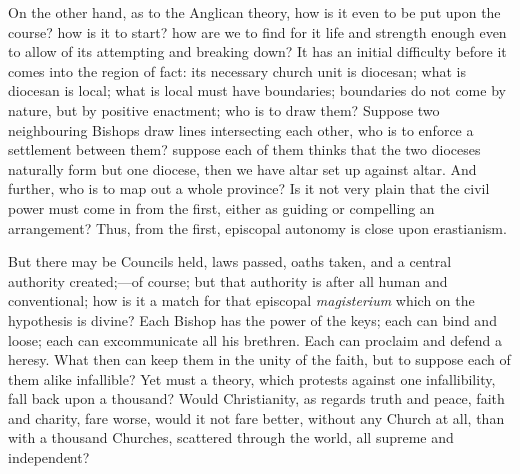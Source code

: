 On the other hand, as to the Anglican theory, how is it even to be
put upon the course? how is it to start? how are we to find for it
life and strength enough even to allow of its attempting and breaking
down? It has an initial difficulty before it comes into the region of
fact: its necessary church unit is diocesan; what is diocesan is
local; what is local must have boundaries; boundaries do not come by
nature, but by positive enactment; who is to draw them? Suppose two
neighbouring Bishops draw lines intersecting each other, who is to
enforce a settlement between them? suppose each of them thinks that
the two dioceses naturally form but one diocese, then we have altar
set up against altar. And further, who is to map out a whole province?
Is it not very plain that the civil power must come in from the first,
either as guiding or compelling an arrangement? Thus, from the first,
episcopal autonomy is close upon erastianism.

But there may be Councils held, laws passed, oaths taken, and a
central authority created;—of course; but that authority is after
all human and conventional; how is it a match for that episcopal \emph{magisterium}
which on the hypothesis is divine? Each Bishop has the power of the
keys; each can bind and loose; each can excommunicate all his
brethren. Each can proclaim and defend a heresy. What then can keep
them in the unity of the faith, but to suppose each of them alike
infallible? Yet must a theory, which protests against one
infallibility, fall back upon a thousand? Would Christianity, as
regards truth and peace, faith and charity, fare worse, would it not
fare better, without any Church at all, than with a thousand
Churches, scattered through the world, all supreme and independent?

